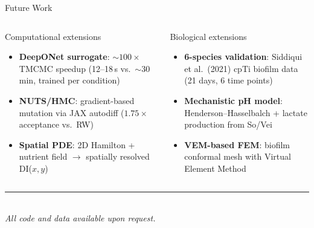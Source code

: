 \documentclass[aspectratio=169,10pt]{beamer}
\begin{document}
\begin{frame}[t]{Future Work}
  \small
  \begin{columns}[T]
      \begin{block}{Computational extensions}
        \begin{itemize}\setlength{\itemsep}{3pt}
          \item \textbf{DeepONet surrogate}: ${\sim}100\times$ TMCMC speedup
                (12--18\,s vs.\ ${\sim}30$\,min, trained per condition)
          \item \textbf{NUTS/HMC}: gradient-based mutation via
                JAX autodiff ($1.75\times$ acceptance vs.\ RW)
          \item \textbf{Spatial PDE}: 2D Hamilton + nutrient field
                $\to$ spatially resolved DI($x,y$)
        \end{itemize}
      \end{block}
      \begin{block}{Biological extensions}
        \begin{itemize}\setlength{\itemsep}{3pt}
          \item \textbf{6-species validation}: Siddiqui et al.\ (2021)
                cpTi biofilm data (21 days, 6 time points)
          \item \textbf{Mechanistic pH model}: Henderson--Hasselbalch
                + lactate production from So/Vei
          \item \textbf{VEM-based FEM}: biofilm conformal mesh
                with Virtual Element Method
        \end{itemize}
      \end{block}
  \end{columns}
  \vspace{8pt}
  \centering
  {\color{ikm}\rule{0.5\textwidth}{0.6pt}}\\[4pt]
  \small\textit{All code and data available upon request.}
\end{frame}

\end{document}
